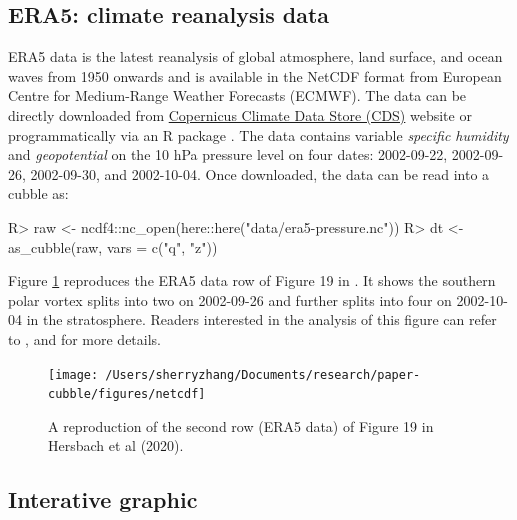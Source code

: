 \documentclass[
]{jss}
\begin{document}
\hypertarget{era5-climate-reanalysis-data}{%
\subsection{ERA5: climate reanalysis
data}\label{era5-climate-reanalysis-data}}

ERA5 data \citep{hersbach2020era5} is the latest reanalysis of global
atmosphere, land surface, and ocean waves from 1950 onwards and is
available in the NetCDF format from European Centre for Medium-Range
Weather Forecasts (ECMWF). The data can be directly downloaded from
\href{https://cds.climate.copernicus.eu/cdsapp\#!/dataset/reanalysis-era5-pressure-levels?tab=overview}{Copernicus
Climate Data Store (CDS)} website or programmatically via an R package
 \citep{ecwmfr}. The  data contains
variable \emph{specific humidity} and \emph{geopotential} on the 10 hPa
pressure level on four dates: 2002-09-22, 2002-09-26, 2002-09-30, and
2002-10-04. Once downloaded, the data can be read into a cubble as:

\begin{CodeChunk}
\begin{CodeInput}
R> raw <- ncdf4::nc_open(here::here("data/era5-pressure.nc"))
R> dt <- as_cubble(raw, vars = c("q", "z"))
\end{CodeInput}
\end{CodeChunk}

Figure \ref{fig:netcdf} reproduces the ERA5 data row of Figure 19 in
\citet{hersbach2020era5}. It shows the southern polar vortex splits into
two on 2002-09-26 and further splits into four on 2002-10-04 in the
stratosphere. Readers interested in the analysis of this figure can
refer to \citet{hersbach2020era5}, \citet{simmons2020global} and
\citet{simmons2005ecmwf} for more details.

\begin{CodeChunk}
\begin{figure}

{\centering \texttt{[image: /Users/sherryzhang/Documents/research/paper-cubble/figures/netcdf]} 

}

\caption[A reproduction of the second row (ERA5 data) of Figure 19 in  Hersbach et al (2020)]{A reproduction of the second row (ERA5 data) of Figure 19 in  Hersbach et al (2020).}\label{fig:netcdf}
\end{figure}
\end{CodeChunk}

\hypertarget{interative-graphic}{%
\subsection{Interative graphic}\label{interative-graphic}}
\end{document}
